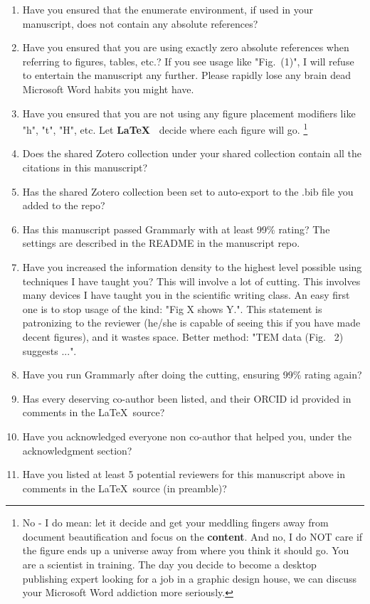 \documentclass[12pt,twocolumn]{article}
\begin{document}
{{\begin{enumerate}
    \item Have you ensured that the enumerate environment, if used in your manuscript, does not contain any absolute references?
    \item Have you ensured that you are using exactly zero absolute references when referring to figures, tables, etc.? If you see usage like "Fig.~(1)", I will refuse to entertain the manuscript any further. Please rapidly lose any brain dead Microsoft Word habits you might have.
    \item Have you ensured that you are not using any figure placement modifiers like "h", "t", "H", etc. Let \textbf{\LaTeX\ } decide where each figure will go. \footnote{No - I do mean: let it decide and get your meddling fingers away from document beautification and focus on the \textbf{content}. And no, I do NOT care if the figure ends up a universe away from where you think it should go. You are a scientist in training. The day you decide to become a desktop publishing expert looking for a job in a graphic design house, we can discuss your Microsoft Word addiction more seriously.}
    \item Does the shared Zotero collection under your shared collection contain all the citations in this manuscript?
    \item Has the shared Zotero collection been set to auto-export to the .bib file you added to the repo?
    \item Has this manuscript passed Grammarly with at least 99\% rating? The settings are described in the README in the manuscript repo.
    \item Have you increased the information density to the highest level possible using techniques I have taught you? This will involve a lot of cutting. This involves many devices I have taught you in the scientific writing class. An easy first one is to stop usage of the kind: "Fig X shows Y.". This statement is patronizing to the reviewer (he/she is capable of seeing this if you have made decent figures), and it wastes space. Better method: "TEM data (Fig.~ 2) suggests ...".
    \item Have you run Grammarly after doing the cutting, ensuring 99\% rating again?
    \item Has every deserving co-author been listed, and their ORCID id provided in comments in the \LaTeX\ source?
    \item Have you acknowledged everyone non co-author that helped you, under the acknowledgment section?
    \item Have you listed at least 5 potential reviewers for this manuscript above in comments in the \LaTeX\ source (in preamble)?
    \end{enumerate}
  }%
}
\end{document}
